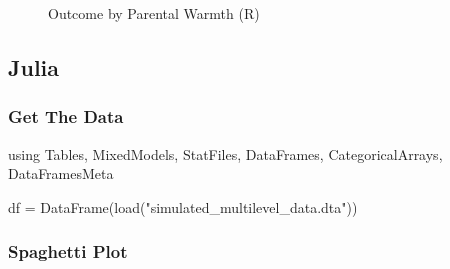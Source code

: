 \documentclass[
  letterpaper,
  DIV=11,
  numbers=noendperiod]{scrreprt}
\newenvironment{Shaded}{\begin{snugshade}}{\end{snugshade}}
\newcommand{\BuiltInTok}[1]{\textcolor[rgb]{0.00,0.23,0.31}{#1}}
\newcommand{\FunctionTok}[1]{\textcolor[rgb]{0.28,0.35,0.67}{#1}}
\newcommand{\ImportTok}[1]{\textcolor[rgb]{0.00,0.46,0.62}{#1}}
\newcommand{\NormalTok}[1]{\textcolor[rgb]{0.00,0.23,0.31}{#1}}
\newcommand{\OperatorTok}[1]{\textcolor[rgb]{0.37,0.37,0.37}{#1}}
\newcommand{\StringTok}[1]{\textcolor[rgb]{0.13,0.47,0.30}{#1}}
\begin{document}
\begin{figure}[H]


\caption{\label{fig-Rspagplot}Outcome by Parental Warmth (R)}

\end{figure}%

\subsection{Julia}

\subsubsection{Get The Data}\label{get-the-data-8}

\begin{Shaded}
\begin{Highlighting}[]
\ImportTok{using} \BuiltInTok{Tables}\NormalTok{, }\BuiltInTok{MixedModels}\NormalTok{, }\BuiltInTok{StatFiles}\NormalTok{, }\BuiltInTok{DataFrames}\NormalTok{, }\BuiltInTok{CategoricalArrays}\NormalTok{, }\BuiltInTok{DataFramesMeta}

\NormalTok{df }\OperatorTok{=} \FunctionTok{DataFrame}\NormalTok{(}\FunctionTok{load}\NormalTok{(}\StringTok{"simulated\_multilevel\_data.dta"}\NormalTok{))}
\end{Highlighting}
\end{Shaded}

\subsubsection{Spaghetti Plot}\label{spaghetti-plot-2}
\end{document}

